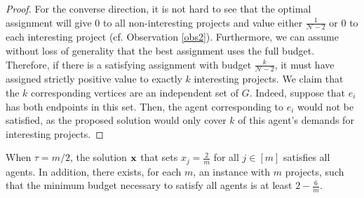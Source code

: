 \documentclass{article}
\begin{document}
\begin{proof}
For the converse direction, it is not hard to see that the optimal assignment
will give $0$ to all non-interesting projects and value either $\frac{1}{\mathscr{N}-2}$
or $0$ to each interesting project  (cf. Observation \ref{obs2}). Furthermore, we can assume without loss of
generality that the best assignment uses the full budget. Therefore, if there
is a satisfying assignment with budget $\frac{k}{\mathscr{N}-2}$, it must have assigned
strictly positive value to exactly $k$ interesting projects. We claim that the
$k$ corresponding vertices are an independent set of $G$.  Indeed, suppose that
$e_i$ has both endpoints in this set. Then, the agent corresponding to $e_i$
would not be satisfied, as the proposed solution would only cover $k$ of this
agent's demands for interesting projects.  \end{proof}

\begin{theorem} When $\tau=m/2$, the solution ${\bf x}$ that sets $x_j=\frac{2}{m}$ for all $j\in[m]$ satisfies all agents. In addition, there exists, for each $m$,  an instance with $m$ projects, such 
that the minimum budget necessary to satisfy all agents is at least
$2-\frac{6}{m}$.
\end{theorem}
\end{document}
